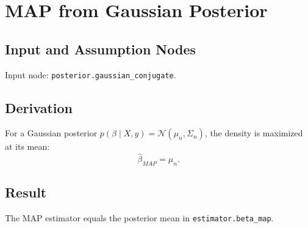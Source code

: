 \section{MAP from Gaussian Posterior}
\label{deriv:map-from-posterior}

\subsection{Input and Assumption Nodes}
Input node: \texttt{posterior.gaussian\_conjugate}.

\subsection{Derivation}
For a Gaussian posterior \(p(\beta\mid X,y)=\mathcal{N}(\mu_n,\Sigma_n)\), the density is maximized at its mean:
\[
  \hat{\beta}_{MAP} = \mu_n.
\]

\subsection{Result}
The MAP estimator equals the posterior mean in \texttt{estimator.beta\_map}.


